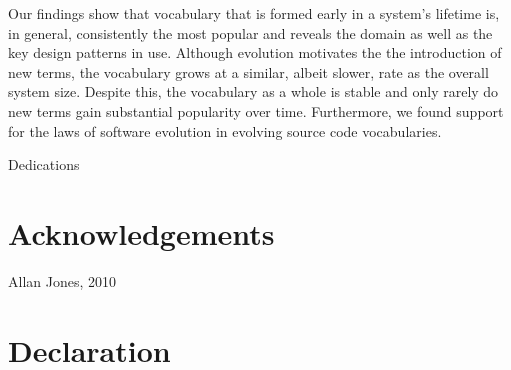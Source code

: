 Our findings show that vocabulary that is formed early in a system's lifetime is, in general, consistently the most popular and reveals the domain as well as the key design patterns in use. Although evolution motivates the the introduction of new terms, the vocabulary grows at a similar, albeit slower, rate as the overall system size. Despite this, the vocabulary as a whole is stable and only rarely do new terms gain substantial popularity over time. Furthermore, we found support for the laws of software evolution in evolving source code vocabularies.


\newpage \vspace*{8cm} 
\begin{center}
	\large Dedications
\end{center}
\newpage

\chapter*{Acknowledgements}
\vspace{-0.5cm}

\vspace*{4cm}
Allan Jones, 2010

\chapter*{Declaration}
\vspace{-0.5cm}

\singlespacing

\tableofcontents \listoffigures \listoftables 
\newpage

